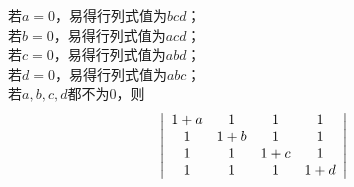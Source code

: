 \begin{enumerate}[1~]
\begin{enumerate}[1.~]
\begin{solution}
若$a=0$，易得行列式值为$bcd$；\\
若$b=0$，易得行列式值为$acd$；\\
若$c=0$，易得行列式值为$abd$；\\
若$d=0$，易得行列式值为$abc$；\\
若$a, b, c, d$都不为0，则
\begin{align*}
&\left| \begin{array} { c c c c } { 1 + a } & { 1 } & { 1 } & { 1 } \\ { 1 } & { 1 + b } & { 1 } & { 1 } \\ { 1 } & { 1 } & { 1 + c } & { 1 } \\ { 1 } & { 1 } & { 1 } & { 1 + d } \end{array} \right|

\end{align*}
\end{solution}
\end{enumerate}
\end{enumerate}
